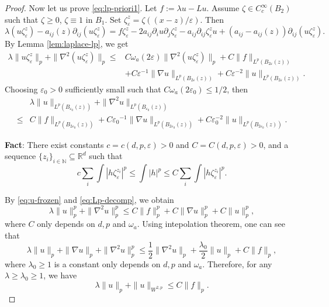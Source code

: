 \documentclass[twoside, 12pt]{book}
\numberwithin{equation}{chapter}
\def\mN{{\mathbb N}}
\def\mR{{\mathbb R}}
\def\geq{\geqslant}
\def\leq{\leqslant}
\def\p{\partial}
\def\eps{\varepsilon}
\begin{document}
\begin{proof}
		Now let us prove \eqref{eq:lp-priori1}. Let $f:=\lambda u-L u$. Assume $\zeta\in C_c^\infty(B_2)$ such that $\zeta\geq 0$, $\zeta\equiv1$ in $B_1$. Set $\zeta_\eps^z=\zeta((x-z)/\eps)$. Then 
		\begin{equation*}
			\lambda (u\zeta_\eps^z) - a_{ij}(z)\p_{ij}(u\zeta_\eps^z) =  f\zeta_\eps^z-2a_{ij}\p_i u\p_{j}\zeta_\eps^z -a_{ij}\p_{ij}\zeta_\eps^z u +(a_{ij}-a_{ij}(z)) \p_{ij}(u\zeta_\eps^z). 
		\end{equation*}
		By Lemma \ref{lem:laplace-lp},  we get 
		\begin{equation*}
			\begin{aligned}
				\lambda \|u \zeta_\eps^z\|_p+ \|\nabla^2(u\zeta_\eps^z)\|_{p} \leq & C \omega_a(2\eps) \|\nabla^2 (u\zeta_\eps^z)\|_p+ C \|f\|_{L^p(B_{2\eps}(z))}\\
				&+C \eps^{-1} \|\nabla u \|_{L^p(B_{2\eps}(z))}+ C\eps^{-2} \|u\|_{L^p(B_{2\eps}(z))}. 
			\end{aligned}
		\end{equation*}
		Choosing $\eps_0>0$ sufficiently small such that $C\omega_a(2\eps_0)\leq 1/2$, then 
		\begin{equation}\label{eq:u-frozen}
			\begin{aligned}
				&\lambda \|u\|_{L^p(B_{\eps_0}(z))} + \|\nabla^2 u\|_{L^p(B_{\eps_0}(z))} \\
				\leq& C \|f\|_{L^p(B_{2{\eps_0}}(z))}+C {\eps_0}^{-1} \|\nabla u \|_{L^p(B_{2{\eps_0}}(z))}+ C\eps_0^{-2} \|u\|_{L^p(B_{2{\eps_0}}(z))}. 
			\end{aligned}
		\end{equation}
		\begin{framed}
		    {\bf Fact}: There exist constants $c=c(d,  p, \eps)>0$ and $C=C(d,  p, \eps)>0$, and a sequence $\{z_i \}_{i\in \mN}\subseteq \mR^d$ such that 
		    \begin{equation}\label{eq:Lp-decomp}
			    c \sum_{i} \int |h\zeta_\eps^{z_i}|^p   \leq \int |h|^p \leq C \sum_{i} \int |h\zeta_\eps^{z_i}|^p. 
		    \end{equation}
		\end{framed}
		By \eqref{eq:u-frozen} and \eqref{eq:Lp-decomp}, we obtain 
		\begin{equation*}
			\lambda \|u\|_{p}^p + \|\nabla^2 u\|_{p}^p 
			\leq C \|f\|_{p}^p+C \|\nabla u \|_{p}^p+ C \|u\|_{p}^p, 
		\end{equation*}
		where $C$ only depends on $d, p$ and $\omega_a$. Using intepolation theorem, one can see that 
		\[
		    \lambda \|u\|_{p} +\|\nabla u\|_p + \|\nabla^2 u\|_{p}^p \leq \frac{1}{2} \|\nabla^2 u\|_p+ \frac{\lambda_0}{2} \|u\|_{p} + C \|f\|_p, 
		\]
		where $\lambda_0\geq 1$ is a constant only depends on $d, p$ and $\omega_a$. Therefore, for any $\lambda \geq \lambda_0\geq 1$, we have 
		\[
		    \lambda \|u\|_p+\| u\|_{W^{2,p}} \leq C \|f\|_p. 
		\]
	\end{proof}
	
\end{document}
